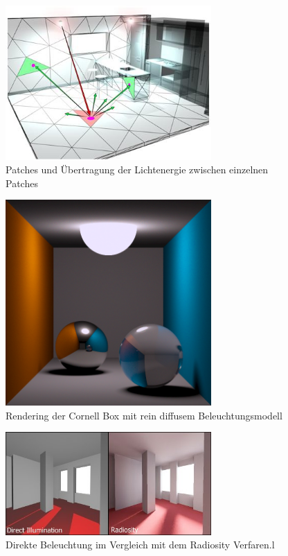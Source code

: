  \begin{figure}[H]
    \centering
    \includegraphics[width=0.7\textwidth]{images/radiosity_process.jpg}
    \caption{Patches und Übertragung der Lichtenergie zwischen einzelnen Patches}
    \label{fig:diffus}
\end{figure}

 \begin{figure}[H]
    \centering
    \includegraphics[width=0.7\textwidth]{images/diffus.png}
    \caption{Rendering der Cornell Box mit rein diffusem Beleuchtungsmodell}
    \label{fig:diffus}
\end{figure}

 \begin{figure}[H]
    \centering
    \includegraphics[width=0.7\textwidth]{images/Radiosity_Comparison.jpg}
    \caption{Direkte Beleuchtung im Vergleich mit dem Radiosity Verfaren.l}
    \label{fig:diffus}
\end{figure}
